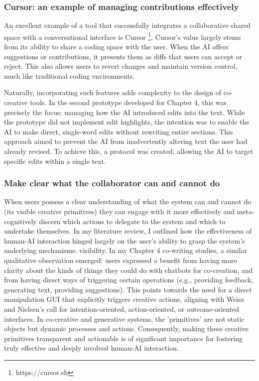 \subsubsection{Cursor: an example of managing contributions effectively}
An excellent example of a tool that successfully integrates a collaborative shared space with a conversational interface is Cursor \footnote{https://cursor.sh}. Cursor's value largely stems from its ability to share a coding space with the user. When the AI offers suggestions or contributions, it presents them as diffs that users can accept or reject. This also allows users to revert changes and maintain version control, much like traditional coding environments.

Naturally, incorporating such features adds complexity to the design of co-creative tools. In the second prototype developed for Chapter 4, this was precisely the focus: managing how the AI introduced edits into the text. While the prototype did not implement edit highlights, the intention was to enable the AI to make direct, single-word edits without rewriting entire sections. This approach aimed to prevent the AI from inadvertently altering text the user had already revised. To achieve this, a protocol was created, allowing the AI to target specific edits within a single text.

\subsubsection{Make clear what the collaborator can and cannot do}

When users possess a clear understanding of what the system can and cannot do (its visible creative primitives) they can engage with it more effectively and meta-cognitively discern which actions to delegate to the system and which to undertake themselves. In my literature review, I outlined how the effectiveness of human-AI interaction hinged largely on the user's ability to grasp the system's underlying mechanisms: visibility. In my Chapter 4 co-writing studies, a similar qualitative observation emerged: users expressed a benefit from having more clarity about the kinds of things they could do with chatbots for co-creation, and from having direct ways of triggering certain operations (e.g., providing feedback, generating text, providing suggestions). This points towards the need for a direct manipulation GUI that explicitly triggers creative actions, aligning with Weisz and Nielsen's call for intention-oriented, action-oriented, or outcome-oriented interfaces. In co-creative and generative systems, the 'primitives' are not static objects but dynamic processes and actions. Consequently, making these creative primitives transparent and actionable is of significant importance for fostering truly effective and deeply involved human-AI interaction.

